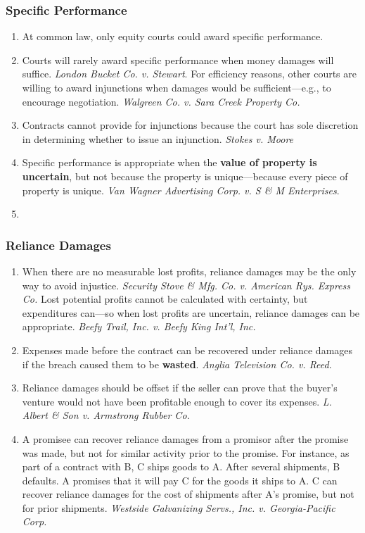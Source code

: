 \subsubsection{Specific Performance}

\begin{enumerate}
    \item At common law, only equity courts could award specific performance.
    \item Courts will rarely award specific performance when money damages 
    will suffice. \emph{London Bucket Co. v. Stewart}. For efficiency reasons, 
    other courts are willing to award injunctions when damages would be 
    sufficient---e.g., to encourage negotiation. \emph{Walgreen Co. v. Sara 
    Creek Property Co.}
    \item Contracts cannot provide for injunctions because the court has sole 
    discretion in determining whether to issue an injunction. \emph{Stokes v. 
    Moore}
    \item Specific performance is appropriate when the \textbf{value of property is 
    uncertain}, but not because the property is unique---because every piece 
    of property is unique.  \emph{Van Wagner Advertising Corp. v. S \& M 
    Enterprises}.
    \item %
\end{enumerate}

\subsubsection{Reliance Damages}

\begin{enumerate}
    \item When there are no measurable lost profits, reliance damages may be 
    the only way to avoid injustice. \emph{Security Stove \& Mfg. Co. v. 
    American Rys. Express Co.} Lost potential profits cannot be calculated 
    with certainty, but expenditures can---so when lost profits are uncertain, 
    reliance damages can be appropriate. \emph{Beefy Trail, Inc. v. Beefy King 
    Int'l, Inc.}
    \item Expenses made before the contract can be recovered under reliance 
    damages if the breach caused them to be \textbf{wasted}. \emph{Anglia 
    Television Co. v. Reed}.
    \item Reliance damages should be offset if the seller can prove that 
    the buyer's venture would not have been profitable enough to cover its 
    expenses. \emph{L. Albert \& Son v. Armstrong Rubber Co.}
    \item A promisee can recover reliance damages from a promisor after the 
    promise was made, but not for similar activity prior to the promise. For 
    instance, as part of a contract with B, C ships goods to A. After several 
    shipments, B defaults. A promises that it will pay C for the goods it 
    ships to A. C can recover reliance damages for the cost of shipments after 
    A's promise, but not for prior shipments. \emph{Westside Galvanizing 
    Servs., Inc. v. Georgia-Pacific Corp.}
\end{enumerate}

